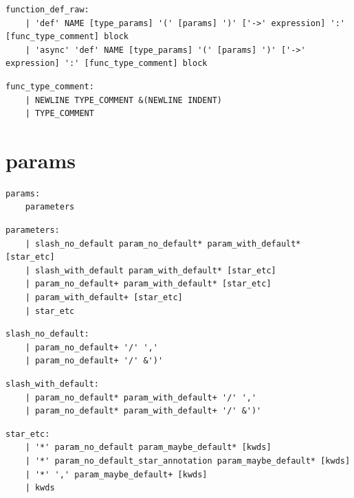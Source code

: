 \noindent\textbf{\texttt{}}\par
\begin{lstlisting}
function_def_raw:
    | 'def' NAME [type_params] '(' [params] ')' ['->' expression] ':' [func_type_comment] block
    | 'async' 'def' NAME [type_params] '(' [params] ')' ['->' expression] ':' [func_type_comment] block
\end{lstlisting}

\noindent\textbf{\texttt{}}\par
\begin{lstlisting}
func_type_comment:
    | NEWLINE TYPE_COMMENT &(NEWLINE INDENT)
    | TYPE_COMMENT
\end{lstlisting}

\section{params}

\noindent\textbf{\texttt{}}\par
\begin{lstlisting}
params:
    parameters
\end{lstlisting}

\noindent\textbf{\texttt{}}\par
\begin{lstlisting}
parameters:
    | slash_no_default param_no_default* param_with_default* [star_etc]
    | slash_with_default param_with_default* [star_etc]
    | param_no_default+ param_with_default* [star_etc]
    | param_with_default+ [star_etc]
    | star_etc
\end{lstlisting}

\noindent\textbf{\texttt{}}\par
\begin{lstlisting}
slash_no_default:
    | param_no_default+ '/' ','
    | param_no_default+ '/' &')'
\end{lstlisting}

\noindent\textbf{\texttt{}}\par
\begin{lstlisting}
slash_with_default:
    | param_no_default* param_with_default+ '/' ','
    | param_no_default* param_with_default+ '/' &')'
\end{lstlisting}

\noindent\textbf{\texttt{}}\par
\begin{lstlisting}
star_etc:
    | '*' param_no_default param_maybe_default* [kwds]
    | '*' param_no_default_star_annotation param_maybe_default* [kwds]
    | '*' ',' param_maybe_default+ [kwds]
    | kwds
\end{lstlisting}

